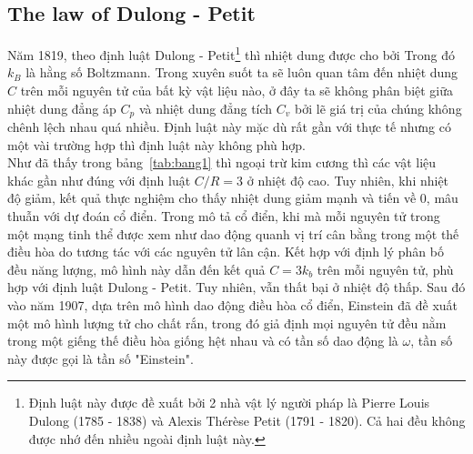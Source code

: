 \subsection{The law of Dulong - Petit}
Năm 1819, theo định luật Dulong - Petit\footnote{Định luật này được đề xuất bởi 2 nhà vật lý người pháp là Pierre Louis Dulong (1785 - 1838) và Alexis Thérèse Petit (1791 - 1820). Cả hai đều không được nhớ đến nhiều ngoài định luật này.} thì nhiệt dung được cho bởi
Trong đó $k_B$ là hằng số Boltzmann. Trong xuyên suốt ta sẽ luôn quan tâm đến nhiệt dung $C$ trên mỗi nguyên tử của bất kỳ vật liệu nào,
ở đây ta sẽ không phân biệt giữa nhiệt dung đẳng áp $C_p$ và nhiệt dung đẳng tích $C_v$ bởi lẽ giá trị của chúng không chênh lệch nhau quá nhiều.
Định luật này mặc dù rất gần với thực tế nhưng có một vài trường hợp thì định luật này không phù hợp. 
\\
Như đã thấy trong bảng~\ref{tab:bang1} thì ngoại trừ kim cương thì các vật liệu khác gần như đúng với định luật $C/R=3$ ở nhiệt độ cao. Tuy nhiên, khi nhiệt độ giảm, kết quả thực nghiệm cho thấy nhiệt dung giảm mạnh và tiến về 0, mâu thuẫn với dự đoán cổ điển.
Trong mô tả cổ điển, khi mà mỗi nguyên tử trong một mạng tinh thể được xem như dao động quanh vị trí cân bằng trong một thế điều hòa do tương tác với các nguyên tử lân cận. Kết hợp với định lý phân bố đều năng lượng, mô hình này dẫn đến kết quả $C=3k_b$ trên mỗi nguyên tử, phù hợp với định luật Dulong - Petit. Tuy nhiên, vẫn thất bại ở nhiệt độ thấp.
Sau đó vào năm 1907, dựa trên mô hình dao động điều hòa cổ điển, Einstein đã đề xuất một mô hình lượng tử cho chất rắn, trong đó giả định mọi nguyên tử đều nằm trong một giếng thế điều hòa giống hệt nhau và có tần số dao động là $\omega$, tần số này được gọi là tần số "Einstein".
